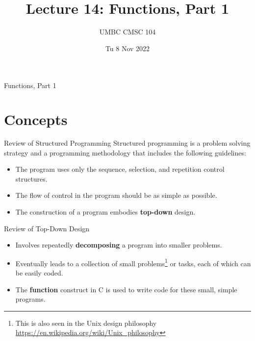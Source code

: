 \documentclass[graphics]{beamer}
\title{Lecture 14: Functions, Part 1}
\author{UMBC CMSC 104}
\date{Tu 8 Nov 2022}
\begin{document}
\begin{frame}{}
\centering
    Functions, Part 1
\end{frame}

\frame{\tableofcontents}

\section{Concepts}
\begin{frame}{Review of Structured Programming}
    Structured programming is a problem solving strategy and a programming methodology that includes the following guidelines:
    \begin{itemize}
        \item The program uses only the sequence, selection, and repetition control structures.
        \item The flow of control in the program should be as simple as possible.
        \item The construction of a program embodies \textbf{top-down} design.
    \end{itemize}
\end{frame}

\begin{frame}{Review of Top-Down Design}
    \begin{itemize}
        \item Involves repeatedly \textbf{decomposing} a program into smaller problems.
        \item Eventually leads to a collection of small problems\footnote{This is also seen in the Unix design philosophy \url{https://en.wikipedia.org/wiki/Unix_philosophy}} or tasks, each of which can be easily coded.
        \item The \textbf{function} construct in C is used to write code for these small, simple programs.
    \end{itemize}
\end{frame}
\end{document}
